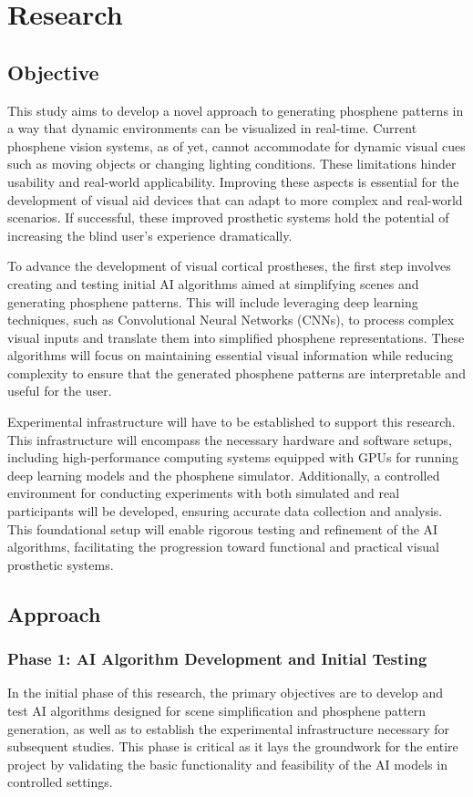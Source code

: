 \documentclass[10pt]{article}
\begin{document}
\section*{Research}\label{sec:research}
\subsection*{Objective}\label{subsec:objective}
This study aims to develop a novel approach to generating phosphene patterns in
a way that dynamic environments can be visualized in real-time. Current
phosphene vision systems, as of yet, cannot accommodate for dynamic visual cues
such as moving objects or changing lighting conditions. These limitations hinder
usability and real-world applicability. Improving these aspects is essential for
the development of visual aid devices that can adapt to more complex and
real-world scenarios. If successful, these improved prosthetic systems hold the
potential of increasing the blind user's experience dramatically.

To advance the development of visual cortical prostheses, the first step
involves creating and testing initial AI algorithms aimed at simplifying scenes
and generating phosphene patterns. This will include leveraging deep learning
techniques, such as Convolutional Neural Networks (CNNs), to process complex
visual inputs and translate them into simplified phosphene representations.
These algorithms will focus on maintaining essential visual information while
reducing complexity to ensure that the generated phosphene patterns are
interpretable and useful for the user.

Experimental infrastructure will have to be established to support
this research. This infrastructure will encompass the necessary hardware and
software setups, including high-performance computing systems equipped with GPUs
for running deep learning models and the phosphene simulator. Additionally, a
controlled environment for conducting experiments with both simulated and real
participants will be developed, ensuring accurate data collection and analysis.
This foundational setup will enable rigorous testing and refinement of the AI
algorithms, facilitating the progression toward functional and practical visual
prosthetic systems.

\subsection*{Approach}\label{subsec:approach}
\subsubsection*{Phase 1: AI Algorithm Development and Initial Testing}
In the initial phase of this research, the primary objectives are to develop and
test AI algorithms designed for scene simplification and phosphene pattern
generation, as well as to establish the experimental infrastructure necessary
for subsequent studies. This phase is critical as it lays the groundwork for the
entire project by validating the basic functionality and feasibility of the AI
models in controlled settings.
\end{document}
